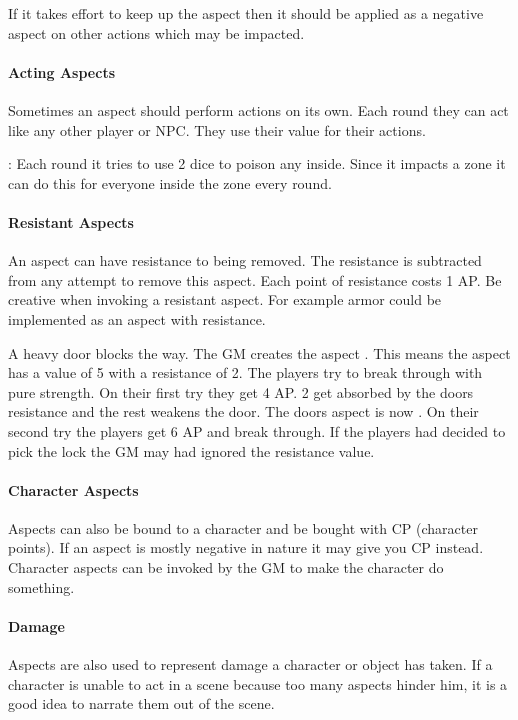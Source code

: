 \documentclass[11pt]{article}
\begin{document}
{If it takes effort to keep up the aspect then it should be applied as a negative aspect on other actions which may be impacted.
\paragraph*{Acting Aspects}
\label{sec:org06d377a}

Sometimes an aspect should perform actions on its own. Each round they can act like any other player or NPC. They use their value for their actions.

\begin{pwexample}
: Each round it tries to use 2 dice to poison any inside. Since it impacts a zone it can do this for everyone inside the zone every round.
\end{pwexample}
\paragraph*{Resistant Aspects}
\label{sec:orgeb44c0a}
An aspect can have resistance to being removed. The resistance is subtracted from any attempt to remove this aspect. Each point of resistance costs 1 AP. Be creative when invoking a resistant aspect. For example armor could be implemented as an aspect with resistance.

\begin{pwexample}
A heavy door blocks the way. The GM creates the aspect . This means the aspect has a value of 5 with a resistance of 2. The players try to break through with pure strength. On their first try they get 4 AP. 2 get absorbed by the doors resistance and the rest weakens the door. The doors aspect is now . On their second try the players get 6 AP and break through.
If the players had decided to pick the lock the GM may had ignored the resistance value.
\end{pwexample}
\paragraph*{Character Aspects}
\label{sec:orgda003e1}

Aspects can also be bound to a character and be bought with CP (character points). If an aspect is mostly negative in nature it may give you CP instead. Character aspects can be invoked by the GM to make the character do something. 
\paragraph*{Damage}
\label{sec:org3bf4993}
Aspects are also used to represent damage a character or object has taken. If a character is unable to act in a scene because too many aspects hinder him, it is a good idea to narrate them out of the scene.

}
\end{document}
